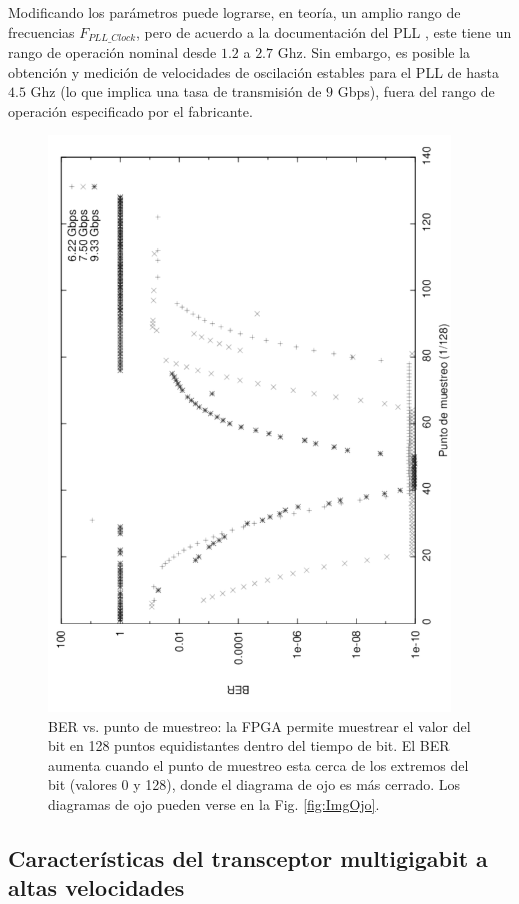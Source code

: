  Modificando los parámetros puede lograrse, en teoría, un amplio rango
de frecuencias $F_{PLL\_Clock}$, pero de acuerdo a la documentación
del PLL \cite[Pág. 71]{ug366}, este tiene un rango de operación nominal desde $1.2$ a
$2.7$ Ghz. Sin embargo, es posible \cite{OBGAH2010} la
obtención y medición de velocidades de oscilación estables para el PLL
de hasta $4.5$ Ghz (lo que implica una tasa de transmisión de $9$ Gbps),
fuera del rango de operación especificado por el fabricante.

\begin{figure}[t]
  \centering
    \includegraphics[width=4.2in,angle=270]{graphs/BER_sp_gray.pdf}
\caption {BER vs. punto de muestreo: la FPGA permite muestrear el valor del bit en 128 puntos equidistantes dentro del tiempo de bit. El BER aumenta cuando el punto de muestreo esta cerca de los extremos del bit (valores 0 y 128), donde el diagrama de ojo es más cerrado. Los diagramas de ojo pueden verse en la Fig. \ref{fig:ImgOjo}.}
\label{fig:BERvsSamplingPoint}
\end{figure}

\subsection{Características del transceptor multigigabit a altas velocidades}


